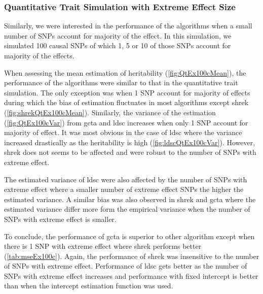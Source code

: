 		\subsubsection{Quantitative Trait Simulation with Extreme Effect Size}
		
		Similarly, we were interested in the performance of the algorithms when a small number of \glspl{SNP} account for majority of the effect. 
		In this simulation, we simulated 100 causal \glspl{SNP} of which 1, 5 or 10 of those \glspl{SNP} account for majority of the effects.
		
		When assessing the mean estimation of heritability (\cref{fig:QtEx100cMean}), the performance of the algorithms were similar to that in the quantitative trait simulation.
		The only exception was when 1 \gls{SNP} account for majority of effects during which the bias of estimation fluctuates in most algorithms except \gls{shrek} (\cref{fig:shrekQtEx100cMean}). 
		Similarly, the variance of the estimation (\cref{fig:QtEx100cVar}) from \gls{gcta} and \gls{ldsc} increases when only 1 \gls{SNP} account for majority of effect.
		It was most obvious in the case of \gls{ldsc} where the variance increased drastically as the heritability is high (\cref{fig:ldscQtEx100cVar}).
		However, \gls{shrek} does not seems to be affected and were robust to the number of \glspl{SNP} with extreme effect. 
		
		The estimated variance of \gls{ldsc} were also affected by the number of \glspl{SNP} with extreme effect where a smaller number of extreme effect \glspl{SNP} the higher the estimated variance. 
		A similar bias was also observed in \gls{shrek} and \gls{gcta} where the estimated variance differ more form the empirical variance when the number of \glspl{SNP} with extreme effect is smaller. 
		
		To conclude, the performance of \gls{gcta} is superior to other algorithm except when there is 1 \gls{SNP} with extreme effect where \gls{shrek} performs better (\cref{tab:mseEx100c}).
		Again, the performance of \gls{shrek} was insensitive to the number of \glspl{SNP} with extreme effect.
		Performance of \gls{ldsc} gets better as the number of \glspl{SNP} with extreme effect increases and performance with fixed intercept is better than when the intercept estimation function was used. 
		 
